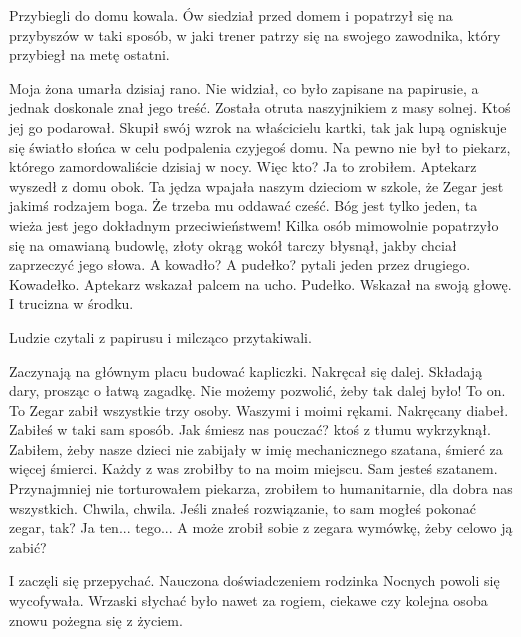 Przybiegli do domu kowala.
Ów siedział przed domem i popatrzył się na przybyszów w taki sposób, w jaki trener patrzy się na swojego zawodnika, który przybiegł na metę ostatni.
\begin{dialogue}
	\ds{} Moja żona umarła dzisiaj rano. \dm{} 
		Nie widział, co było zapisane na papirusie, a jednak doskonale znał jego treść. \dm{} 
		Została otruta naszyjnikiem z masy solnej. Ktoś jej go podarował. \dm{}
		Skupił swój wzrok na właścicielu kartki, tak jak lupą ogniskuje się światło słońca w celu podpalenia czyjegoś domu. \dm{} 
		Na pewno nie był to piekarz, którego zamordowaliście dzisiaj w nocy. Więc kto?
	\ds{} Ja to zrobiłem. \dm{} 
		Aptekarz wyszedł z domu obok. \dm{} 
		Ta jędza wpajała naszym dzieciom w szkole, że Zegar jest jakimś rodzajem boga. Że trzeba mu oddawać cześć. Bóg jest tylko jeden, ta wieża jest jego dokładnym przeciwieństwem! \dm{} 
		Kilka osób mimowolnie popatrzyło się na omawianą budowlę, złoty okrąg wokół tarczy błysnął, jakby chciał zaprzeczyć jego słowa.
	\ds{} A kowadło? A pudełko? \dm{} 
		pytali jeden przez drugiego.
	\ds{} Kowadełko. \dm{} Aptekarz wskazał palcem na ucho. \dm{} Pudełko. \dm{} Wskazał na swoją głowę. \dm{} I trucizna w środku.
\end{dialogue}
Ludzie czytali z papirusu i milcząco przytakiwali.
\begin{dialogue}
	\ds{} Zaczynają na głównym placu budować kapliczki. \dm{} 
		Nakręcał się dalej. \dm{}
		Składają dary, prosząc o łatwą zagadkę. Nie możemy pozwolić, żeby tak dalej było! To on. To Zegar zabił wszystkie trzy osoby. Waszymi i moimi rękami. Nakręcany diabeł.
	\ds{} Zabiłeś w taki sam sposób. Jak śmiesz nas pouczać? \dm{} 
		ktoś z tłumu wykrzyknął.
	\ds{} Zabiłem, żeby nasze dzieci nie zabijały w imię mechanicznego szatana, śmierć za więcej śmierci. Każdy z was zrobiłby to na moim miejscu.
	\ds{} Sam jesteś szatanem. 
	\ds{} Przynajmniej nie torturowałem piekarza, zrobiłem to humanitarnie, dla dobra nas wszystkich.
	\ds{} Chwila, chwila. Jeśli znałeś rozwiązanie, to sam mogłeś pokonać zegar, tak?
	\ds{} Ja ten... tego...
	\ds{} A może zrobił sobie z zegara wymówkę, żeby celowo ją zabić?
\end{dialogue}
I zaczęli się przepychać.
Nauczona doświadczeniem rodzinka Nocnych powoli się wycofywała.
Wrzaski słychać było nawet za rogiem, ciekawe czy kolejna osoba znowu pożegna się z życiem.

